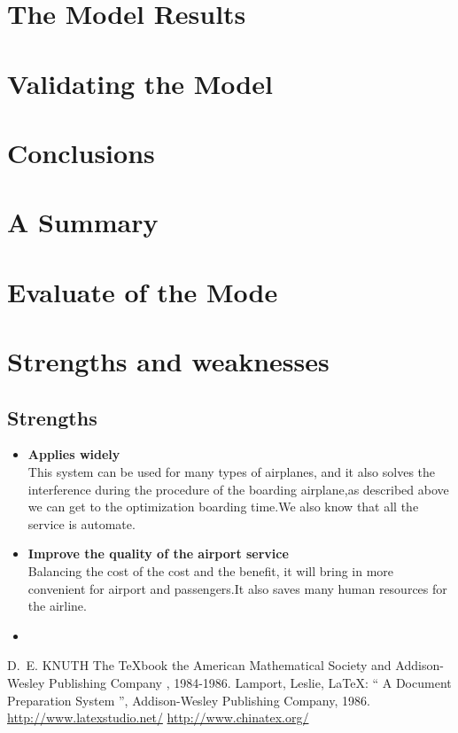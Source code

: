\documentclass{mcmthesis}
\begin{document}
\section{The Model Results}
\lipsum[6]

\section{Validating the Model}
\lipsum[9]

\section{Conclusions}
\lipsum[6]

\section{A Summary}
\lipsum[6]

\section{Evaluate of the Mode}

\section{Strengths and weaknesses}
\lipsum[12]

\subsection{Strengths}
\begin{itemize}
\item \textbf{Applies widely}\\
This  system can be used for many types of airplanes, and it also
solves the interference during  the procedure of the boarding
airplane,as described above we can get to the  optimization
boarding time.We also know that all the service is automate.
\item \textbf{Improve the quality of the airport service}\\
Balancing the cost of the cost and the benefit, it will bring in
more convenient  for airport and passengers.It also saves many
human resources for the airline. \item \textbf{}
\end{itemize}

\begin{thebibliography}{99}
 D.~E. KNUTH   The \TeX{}book  the American
Mathematical Society and Addison-Wesley
Publishing Company , 1984-1986.
Lamport, Leslie,  \LaTeX{}: `` A Document Preparation System '',
Addison-Wesley Publishing Company, 1986.
\url{http://www.latexstudio.net/}
\url{http://www.chinatex.org/}
\end{thebibliography}
\end{document}
